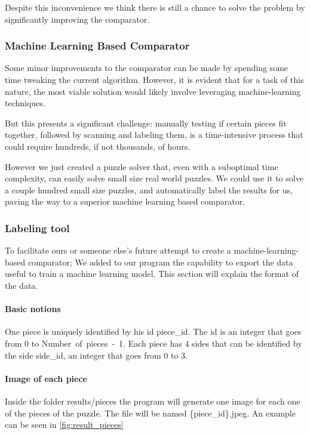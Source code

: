 \documentclass{article}
\begin{document}
Despite this inconvenience we think there is still a chance to solve
the problem by significantly improving the comparator.

\subsubsection{Machine Learning Based Comparator}

Some minor improvements to the comparator can be made by spending some time
tweaking the current algorithm.
However, it is evident that for a task of this nature,
the most viable solution would likely involve
leveraging machine-learning techniques.

But this presents a significant challenge: manually testing if certain
pieces fit together, followed by scanning and labeling them,
is a time-intensive process that could require hundreds,
if not thousands, of hours.

However we just created a puzzle solver that, even with a suboptimal
time complexity, can easily solve small size real world puzzles.
We could use it to solve a couple hundred small size puzzles,
and automatically label the results for us,
paving the way to a superior machine learning based comparator.

\subsubsection{Labeling tool}

To facilitate ours or someone else's future attempt to create a 
machine-learning-based comparator;
We added to our program the capability to export the data useful
to train a machine learning model.
This section will explain the format of the data.

\paragraph {Basic notions}

One piece is uniquely identified by his id piece\_id.
The id is an integer that goes from 0 to \mbox{Number of pieces - 1}.
Each piece has 4 sides that can be identified by the side side\_id,
an integer that goes from 0 to 3.

\paragraph {Image of each piece}

Inside the folder results/pieces the program will generate one image
for each one of the pieces of the puzzle. The file will be named \{piece\_id\}.jpeg.
An example can be seen in \cref{fig:result_pieces}
\end{document}
